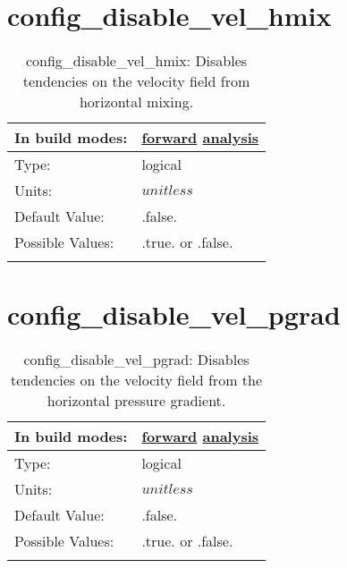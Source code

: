 \section[config\_disable\_vel\_hmix]{config\_disable\_vel\_hmix}
\label{sec:nm_sec_config_disable_vel_hmix}
\begin{center}
\begin{longtable}{| p{2.0in} || p{4.0in} |}
    \hline
    In build modes: & \hyperref[subsec:forward_nm_tab_debug]{forward} \hyperref[subsec:analysis_nm_tab_debug]{analysis} \\
    \hline
    Type: & logical \\
    \hline
    Units: & $unitless$ \\
    \hline
    Default Value: & .false. \\
    \hline
    Possible Values: & .true. or .false. \\
    \hline
    \caption{config\_disable\_vel\_hmix: Disables tendencies on the velocity field from horizontal mixing.}
\end{longtable}
\end{center}
\section[config\_disable\_vel\_pgrad]{config\_disable\_vel\_pgrad}
\label{sec:nm_sec_config_disable_vel_pgrad}
\begin{center}
\begin{longtable}{| p{2.0in} || p{4.0in} |}
    \hline
    In build modes: & \hyperref[subsec:forward_nm_tab_debug]{forward} \hyperref[subsec:analysis_nm_tab_debug]{analysis} \\
    \hline
    Type: & logical \\
    \hline
    Units: & $unitless$ \\
    \hline
    Default Value: & .false. \\
    \hline
    Possible Values: & .true. or .false. \\
    \hline
    \caption{config\_disable\_vel\_pgrad: Disables tendencies on the velocity field from the horizontal pressure gradient.}
\end{longtable}
\end{center}
